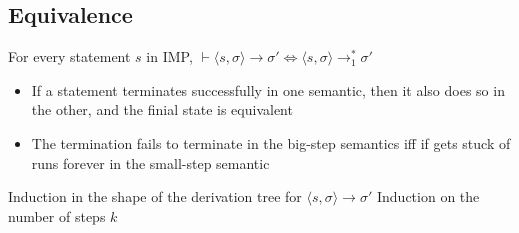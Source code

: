 \subsection{Equivalence}
\begin{itemize}
     For every statement $s$ in IMP, $\vdash \langle s, \sigma \rangle \to \sigma' \iff \langle s, \sigma \rangle \to_1^* \sigma'$
        \begin{itemize}
            \item If a statement terminates successfully in one semantic, then it also does so in the other, and the finial state is equivalent
            \item The termination fails to terminate in the big-step semantics iff if gets stuck of runs forever in the small-step semantic
        \end{itemize}
        \begin{itemize}
            \ides{$\mathbf{\Rightarrow}$:} Induction in the shape of the derivation tree for $\langle s, \sigma \rangle \to \sigma'$
            \ides{$\mathbf{\Leftarrow}$:} Induction on the number of steps $k$
        \end{itemize}
\end{itemize}
